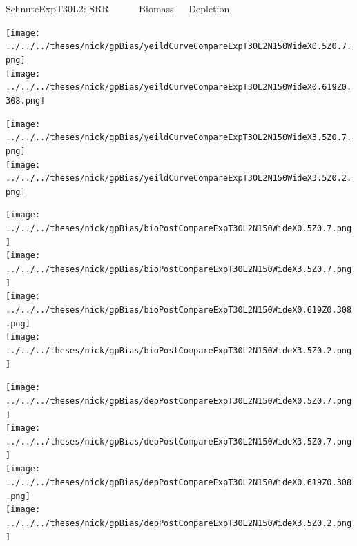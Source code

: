 \documentclass[ xcolor = pdftex, dvipsnames, table ]{beamer}
\begin{document}
%
\begin{frame}{SchnuteExpT30L2: SRR $~~~~~~~~~~~$ Biomass $~~~~$ Depletion}
$~$
\hspace*{-1.25cm}
\begin{minipage}[h!]{0.25\textwidth}
\texttt{[image: ../../../theses/nick/gpBias/yeildCurveCompareExpT30L2N150WideX0.5Z0.7.png]}\\
\texttt{[image: ../../../theses/nick/gpBias/yeildCurveCompareExpT30L2N150WideX0.619Z0.308.png]}
\end{minipage}
\begin{minipage}[h!]{0.25\textwidth}
\hspace*{0.45cm}
\texttt{[image: ../../../theses/nick/gpBias/yeildCurveCompareExpT30L2N150WideX3.5Z0.7.png]}\\
\hspace*{0.45cm}
\texttt{[image: ../../../theses/nick/gpBias/yeildCurveCompareExpT30L2N150WideX3.5Z0.2.png]}
\end{minipage}
\begin{minipage}[h!]{0.25\textwidth}
\vspace{-0.1cm}
\hspace*{1.5cm}
\texttt{[image: ../../../theses/nick/gpBias/bioPostCompareExpT30L2N150WideX0.5Z0.7.png]}\\
\hspace*{1.5cm}
\texttt{[image: ../../../theses/nick/gpBias/bioPostCompareExpT30L2N150WideX3.5Z0.7.png]}\\
\hspace*{1.5cm}
\texttt{[image: ../../../theses/nick/gpBias/bioPostCompareExpT30L2N150WideX0.619Z0.308.png]}\\
\hspace*{1.5cm}
\texttt{[image: ../../../theses/nick/gpBias/bioPostCompareExpT30L2N150WideX3.5Z0.2.png]}
\end{minipage}
\begin{minipage}[h!]{0.25\textwidth}
\vspace{-0.1cm}
\hspace*{1.5cm}
\texttt{[image: ../../../theses/nick/gpBias/depPostCompareExpT30L2N150WideX0.5Z0.7.png]}\\
\hspace*{1.5cm}
\texttt{[image: ../../../theses/nick/gpBias/depPostCompareExpT30L2N150WideX3.5Z0.7.png]}\\
\hspace*{1.5cm}
\texttt{[image: ../../../theses/nick/gpBias/depPostCompareExpT30L2N150WideX0.619Z0.308.png]}\\
\hspace*{1.5cm}
\texttt{[image: ../../../theses/nick/gpBias/depPostCompareExpT30L2N150WideX3.5Z0.2.png]}
\end{minipage}
\end{frame}
\end{document}
